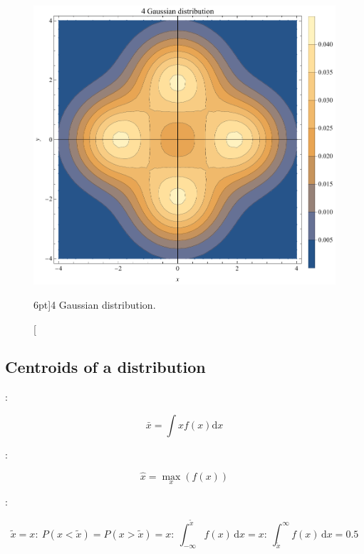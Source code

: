\begin{figure}
	\includegraphics{probability/uncorrelated_4_Gaussian.pdf}
	\caption[4 Gaussian distribution.][6pt]{4 Gaussian distribution.}
	\label{fig:uncorrelated_4_Gaussian}
\end{figure}

\newpage

\subsection{Centroids of a distribution}
\label{subsec:centroid}

:

\begin{equation}
	\bar{x} = \int {x f(x)}\mathrm{d}x
\end{equation}

:

\begin{equation}\label{eq:mode}
	\hat{x} = \max_{x}(f(x))
\end{equation}

:

\begin{equation}\label{eq:median}
	\tilde{x} = x: \ P(x < \tilde{x}) = P(x > \tilde{x}) 
	= x: \ \int_{-\infty}^{\tilde{x}} {f(x)} \,\mathrm{d}x 
	= x: \ \int_{\tilde{x}}^{\infty} {f(x)} \,\mathrm{d}x 
	= 0.5
\end{equation}

